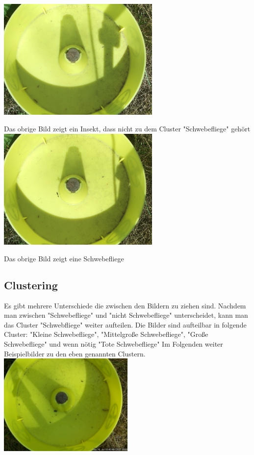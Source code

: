 \documentclass[11pt]{scrartcl}
\begin{document}
\includegraphics[width=0.6\textwidth]{diff144}

Das obrige Bild zeigt ein Insekt, dass nicht zu dem Cluster "Schwebefliege" gehört\\

\includegraphics[width=0.6\textwidth]{diff1552}

Das obrige Bild zeigt eine Schwebefliege


\subsection{Clustering}

Es gibt mehrere Unterschiede die zwischen den Bildern zu ziehen sind. Nachdem man zwischen "Schwebefliege" und "nicht Schwebefliege" 
unterscheidet, kann man das Cluster "Schwebfliege" weiter aufteilen. Die Bilder sind aufteilbar in folgende Cluster: "Kleine Schwebefliege",
"Mittelgroße Schwebefliege", "Große Schwebefliege" und wenn nötig "Tote Schwebefliege" Im Folgenden weiter Beispielbilder zu den 
eben genannten Clustern.\\

\includegraphics[width=0.5\textwidth]{diff4079}
\end{document}
